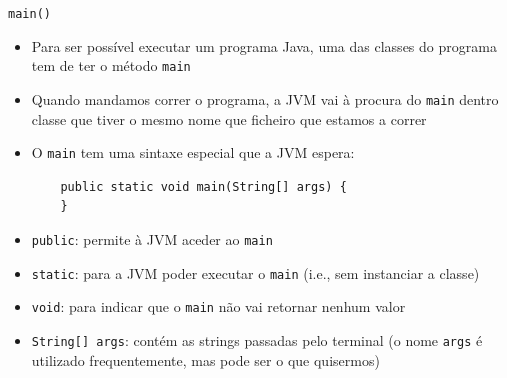 \documentclass[portuguese, aspectratio=169, xcolor=table]{beamer}
\begin{document}
    
\begin{frame}[fragile]{\texttt{main()}}
    \begin{itemize}
        \item Para ser possível executar um programa Java, uma das classes do programa tem de ter o método \texttt{main}
        \item Quando mandamos correr o programa, a JVM vai à procura do \texttt{main} dentro classe que tiver o mesmo nome que ficheiro  que estamos a correr
        \item O \texttt{main} tem uma sintaxe especial que a JVM espera:
\begin{verbatim}
    public static void main(String[] args) {
    }
\end{verbatim}
    \end{itemize}
\begin{itemize}
\item \texttt{public}: permite à JVM aceder ao \texttt{main}
\item \texttt{static}: para a JVM poder executar o \texttt{main} (i.e., sem instanciar a classe)
\item \texttt{void}: para indicar que o \texttt{main} não vai retornar nenhum valor
\item \texttt{String[] args}: contém as strings passadas pelo terminal (o nome \texttt{args} é utilizado frequentemente, mas pode ser o que quisermos)
\end{itemize}
\end{frame}
    
\end{document}

